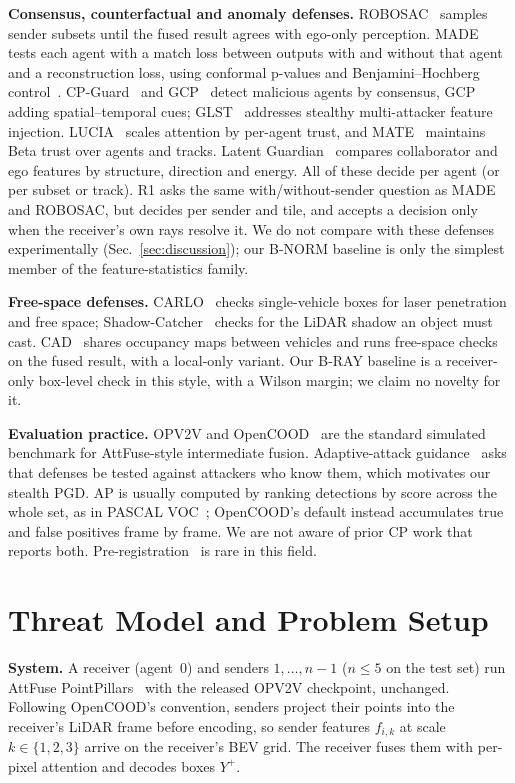 \documentclass[conference]{IEEEtran}
\begin{document}
\textbf{Consensus, counterfactual and anomaly defenses.}
ROBOSAC~\cite{li2023robosac} samples sender subsets until the fused result agrees with ego-only perception.
MADE~\cite{zhao2024made} tests each agent with a match loss between outputs with and without that agent and
a reconstruction loss, using conformal p-values and Benjamini--Hochberg control~\cite{benjamini1995fdr}.
CP-Guard~\cite{hu2025cpguard} and GCP~\cite{tao2026gcp} detect malicious agents by consensus, GCP adding
spatial--temporal cues; GLST~\cite{he2026glst} addresses stealthy multi-attacker feature injection.
LUCIA~\cite{wang2025lucia} scales attention by per-agent trust, and MATE~\cite{hallyburton2025mate} maintains
Beta trust over agents and tracks. Latent Guardian~\cite{zhang2026latentguardian} compares collaborator and ego
features by structure, direction and energy. All of these decide per agent (or per subset or track). R1 asks the
same with/without-sender question as MADE and ROBOSAC, but decides per sender and tile, and accepts a decision
only when the receiver's own rays resolve it. We do not compare with these defenses experimentally
(Sec.~\ref{sec:discussion}); our B-NORM baseline is only the simplest member of the feature-statistics family.

\textbf{Free-space defenses.}
CARLO~\cite{sun2020carlo} checks single-vehicle boxes for laser penetration and free space;
Shadow-Catcher~\cite{hau2021shadowcatcher} checks for the LiDAR shadow an object must cast. CAD~\cite{zhang2024cad}
shares occupancy maps between vehicles and runs free-space checks on the fused result, with a local-only
variant. Our B-RAY baseline is a receiver-only box-level check in this style, with a Wilson margin; we claim
no novelty for it.

\textbf{Evaluation practice.}
OPV2V and OpenCOOD~\cite{xu2022opv2v} are the standard simulated benchmark for AttFuse-style intermediate
fusion. Adaptive-attack guidance~\cite{carlini2019evaluating,tramer2020adaptive} asks that defenses be tested
against attackers who know them, which motivates our stealth PGD. AP is usually computed by ranking detections
by score across the whole set, as in PASCAL VOC~\cite{everingham2010voc}; OpenCOOD's default instead accumulates
true and false positives frame by frame. We are not aware of prior CP work that reports both.
Pre-registration~\cite{nosek2018preregistration} is rare in this field.

\section{Threat Model and Problem Setup}
\label{sec:threat}
\textbf{System.} A receiver (agent~0) and senders $1,\dots,n{-}1$ ($n\le 5$ on the test set) run AttFuse
PointPillars~\cite{xu2022opv2v,lang2019pointpillars} with the released OPV2V checkpoint, unchanged. Following
OpenCOOD's convention, senders project their points into the receiver's LiDAR frame before encoding, so
sender features $f_{i,k}$ at scale $k\in\{1,2,3\}$ arrive on the receiver's BEV grid. The receiver fuses
them with per-pixel attention and decodes boxes $Y^{+}$.
\end{document}
